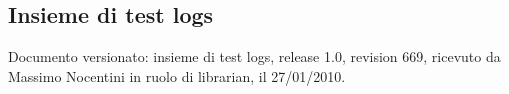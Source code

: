 \subsection{Insieme di test logs}
Documento versionato: insieme di test logs, release 1.0, revision 669, ricevuto
da Massimo Nocentini in ruolo di librarian, il 27/01/2010.